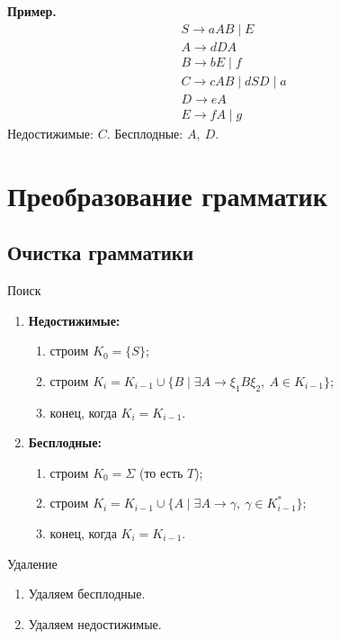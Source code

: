 \documentclass[11pt,a4paper]{article}
\newcommand{\rul}{\rightarrow}
\begin{document}
\textbf{Пример.}
\[
\begin{array}{l}
S\rul aAB\mid E\\ A\rul dDA\\ B\rul bE\mid f\\ C\rul cAB\mid dSD\mid a\\ D\rul eA\\ E\rul fA\mid g
\end{array}
\]
Недостижимые: $C$. Бесплодные: $A,\ D$.

\section{Преобразование грамматик}

\subsection{Очистка грамматики}

\begin{kvb}{Поиск}
\begin{enumerate}
\item \textbf{Недостижимые:}
  \begin{enumerate}
  \item строим $K_0=\{S\}$;
  \item строим $K_i=K_{i-1}\cup\{B\mid\exists A\rul\xi_1B\xi_2,\ A\in K_{i-1}\}$;
  \item конец, когда $K_i=K_{i-1}$.
  \end{enumerate}
\item \textbf{Бесплодные:}
  \begin{enumerate}
  \item строим $K_0=\Sigma$ (то есть $T$);
  \item строим $K_i=K_{i-1}\cup\{A\mid\exists A\rul\gamma,\ \gamma\in K_{i-1}^*\}$;
  \item конец, когда $K_i=K_{i-1}$.
  \end{enumerate}
\end{enumerate}
\end{kvb}

\begin{kob}{Удаление}
\begin{enumerate}
\item Удаляем бесплодные.
\item Удаляем недостижимые.
\end{enumerate}
\end{kob}
\end{document}
